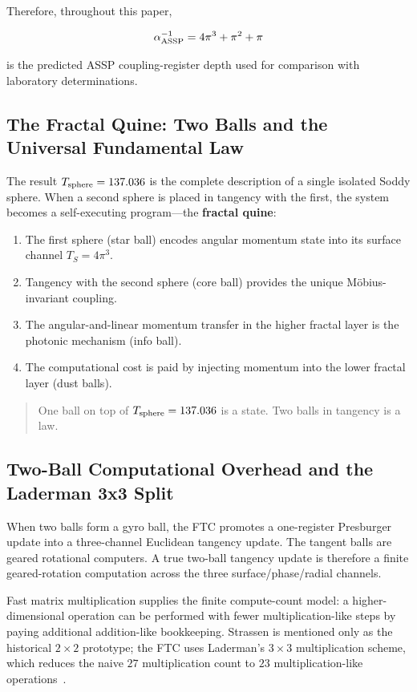 \documentclass[11pt,a4paper]{article}
\begin{document}
Therefore, throughout this paper,

\[
\alpha_{\rm ASSP}^{-1}
=
4\pi^3+\pi^2+\pi
\]

is the predicted ASSP coupling-register depth used for comparison with laboratory determinations.


\subsection{The Fractal Quine: Two Balls and the Universal Fundamental Law}
\label{sec:quine}

The result $T_{\rm sphere} = 137.036$ is the complete description of a single isolated Soddy sphere. When a second sphere is placed in tangency with the first, the system becomes a self-executing program---the \textbf{fractal quine}:

\begin{enumerate}
  \item The first sphere (star ball) encodes angular momentum state into its surface channel $T_S = 4\pi^3$.
  \item Tangency with the second sphere (core ball) provides the unique Möbius-invariant coupling.
  \item The angular-and-linear momentum transfer in the higher fractal layer is the photonic mechanism (info ball).
  \item The computational cost is paid by injecting momentum  into the lower fractal layer (dust balls).
\end{enumerate}

\begin{quote}
One ball on top of $T_{\rm sphere} = 137.036$ is a state. Two balls in tangency is a law.
\end{quote}


\subsection{Two-Ball Computational Overhead and the Laderman 3x3 Split}
\label{sec:laderman_split}

When two balls form a gyro ball, the FTC promotes a one-register Presburger update into a three-channel Euclidean tangency update. The tangent balls are geared rotational computers. A true two-ball tangency update is therefore a finite geared-rotation computation across the three surface/phase/radial channels.

Fast matrix multiplication supplies the finite compute-count model: a higher-dimensional operation can be performed with fewer multiplication-like steps by paying additional addition-like bookkeeping. Strassen is mentioned only as the historical $2\times2$ prototype; the FTC uses Laderman's $3\times3$ multiplication scheme, which reduces the naive $27$ multiplication count to $23$ multiplication-like operations~\cite{Laderman1976}.
\end{document}
